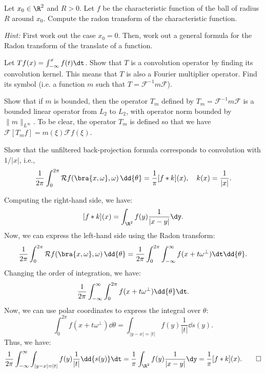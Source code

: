 \renewcommand\F{\mathcal{F}}

\begin{problem}[1]
  Let $x_0 \in \R^2$ and $R > 0$. Let $f$ be the characteristic function of the ball of radius $R$ around $x_0$. Compute the radon transform of the characteristic function.

  \textit{Hint:} First work out the case $x_0 = 0$. Then, work out a general formula for the Radon transform of the translate of a function.
\end{problem}

\begin{solution}
\end{solution}

\begin{problem}[2]
  Let $Tf(x) = \int_{-\infty}^x f(t) \dt$. Show that $T$ is a convolution operator by finding its convolution kernel. This means that $T$ is also a Fourier multiplier operator. Find its symbol (i.e. a function $m$ such that $T = \F^{-1}m\F$).
\end{problem}

\begin{solution}
\end{solution}

\begin{problem}[3]
  Show that if $m$ is bounded, then the operator $T_m$ defined by $T_m = \F^{-1}m\F$ is a bounded linear operator from $L_2$ to $L_2$, with operator norm bounded by $\|m\|_{L^\infty}$. To be clear, the operator $T_m$ is defined so that we have $\F[T_mf] = m(\xi)\F f(\xi)$.
\end{problem}

\begin{solution}
\end{solution}

\begin{problem}[4]
  Show that the unfiltered back-projection formula corresponds to convolution with $1/|x|$, i.e.,
  \[%
    \frac{1}{2\pi}\int_0^{2\pi} \mathcal{R}f(\bra{x, \omega}, \omega) \,\dd{\theta} = \frac{1}{\pi} [f * k](x), \quad k(x) = \frac{1}{|x|}
  .\]%
\end{problem}

\begin{solution}
  Computing the right-hand side, we have:
  \[%
    [f * k](x) = \int_{\R^2} f(y) \frac{1}{|x - y|} \dy
  .\]%
  Now, we can express the left-hand side using the Radon transform:
  \[%
    \frac{1}{2\pi} \int_0^{2\pi} \mathcal{R}f(\bra{x, \omega}, \omega) \,\dd{\theta} = \frac{1}{2\pi} \int_0^{2\pi} \int_{-\infty}^{\infty} f(x + t\omega^\perp) \dt \dd{\theta}
  .\]%
  Changing the order of integration, we have:
  \[%
    \frac{1}{2\pi} \int_{-\infty}^{\infty} \int_0^{2\pi} f(x + t\omega^\perp) \dd{\theta} \dt
  .\]%
  Now, we can use polar coordinates to express the integral over $\theta$:
  \[%
    \int_0^{2\pi} f(x + t\omega^\perp) \dd{\theta} = \int_{|y - x| = |t|} f(y) \frac{1}{|t|} \dd{s(y)}
  .\]%
  Thus, we have:
  \[%
    \frac{1}{2\pi} \int_{-\infty}^{\infty} \int_{|y - x| = |t|} f(y) \frac{1}{|t|} \dd{s(y)} \dt = \frac{1}{\pi} \int_{\R^2} f(y) \frac{1}{|x - y|} \dy = \frac{1}{\pi} [f * k](x)
  .\qedhere\]%
\end{solution}

